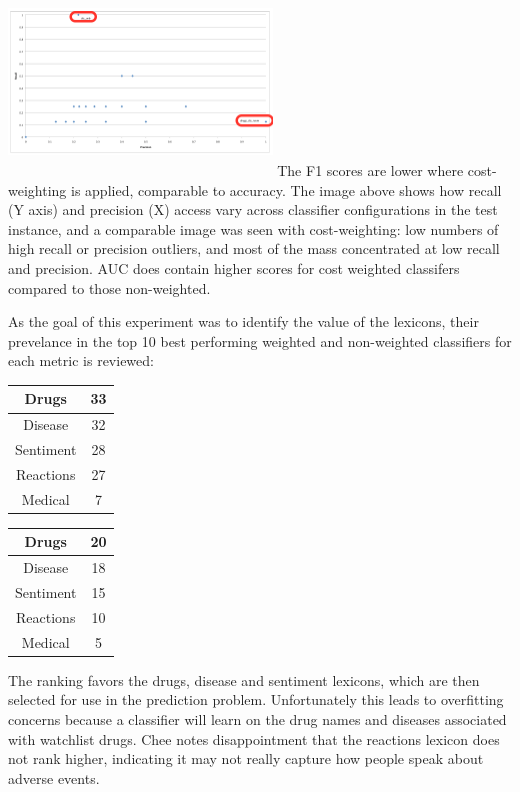 \documentclass[twoside,11pt]{article}
\begin{document}
\includegraphics[width=7cm, height=5cm]{Figure-5-F1.png}
The F1 scores are lower where cost-weighting is applied, comparable to accuracy. The image above shows how recall (Y axis) and precision (X) access vary across classifier configurations in the test instance, and a comparable image was seen with cost-weighting: low numbers of high recall or precision outliers, and most of the mass concentrated at low recall and precision. AUC does contain higher scores for cost weighted classifers compared to those non-weighted.

As the goal of this experiment was to identify the value of the lexicons, their prevelance in the top 10 best performing weighted and non-weighted classifiers for each metric is reviewed:
\begin{center}
  \begin{tabular}{c c}
    \hline
    Drugs & 33\\
    \hline
    Disease & 32\\
    \hline
    Sentiment & 28\\
    \hline
    Reactions & 27\\
    \hline
    Medical & 7\\
    \hline
  \end{tabular}
  \quad
  \begin{tabular}{c c}
    \caption{Weighted Classifers}
    \hline
    Drugs & 20\\
    \hline
    Disease & 18\\
    \hline
    Sentiment & 15\\
    \hline
    Reactions & 10\\
    \hline
    Medical & 5\\
    \hline
  \end{tabular}
\end{center}

The ranking favors the drugs, disease and sentiment lexicons, which are then selected for use in the prediction problem. Unfortunately this leads to overfitting concerns because a classifier will learn on the drug names and diseases associated with watchlist drugs. Chee notes disappointment that the reactions lexicon does not rank higher, indicating it may not really capture how people speak about adverse events.
\end{document}
